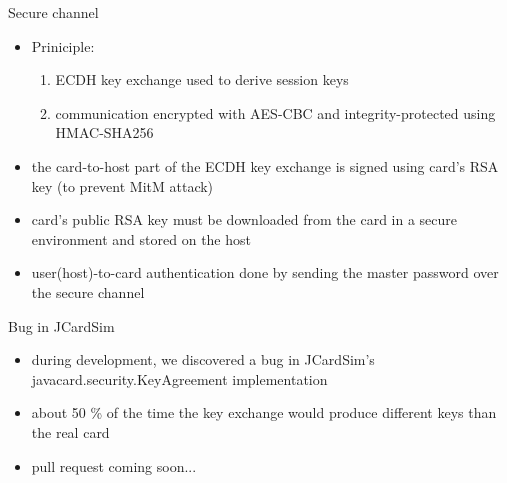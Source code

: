 \documentclass[12pt, t]{beamer}
\begin{document}
\begin{frame}{Secure channel}
  \begin{itemize}
    \item Priniciple:
    \begin{enumerate}
      \item ECDH key exchange used to derive session keys
      \item communication encrypted with AES-CBC and integrity-protected using HMAC-SHA256
    \end{enumerate}
    \item the card-to-host part of the ECDH key exchange is signed using card's RSA key (to prevent MitM attack)
    \item card's public RSA key must be downloaded from the card in a secure environment and stored on the host
    \item user(host)-to-card authentication done by sending the master password over the secure channel
  \end{itemize}
\end{frame}

\begin{frame}{Bug in JCardSim}
  \begin{itemize}
    \item during development, we discovered a bug in JCardSim's javacard.security.KeyAgreement implementation
    \item about 50 \% of the time the key exchange would produce different keys than the real card
    \item pull request coming soon...
  \end{itemize}
\end{frame}
\end{document}
